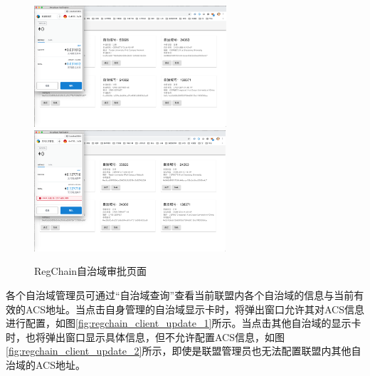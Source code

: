       \begin{figure}[H]
        \centering
        {\includegraphics[height=4.5cm]{figures/regchain_client_review_1.png}}
        \hspace{1em}
        {\includegraphics[height=4.5cm]{figures/regchain_client_review_2.png}}
        \caption{RegChain自治域审批页面}
        \label{fig:regchain_client_review}
      \end{figure}

      各个自治域管理员可通过“自治域查询”查看当前联盟内各个自治域的信息与当前有效的ACS地址。当点击自身管理的自治域显示卡时，将弹出窗口允许其对ACS信息进行配置，如图\ref{fig:regchain_client_update_1}所示。当点击其他自治域的显示卡时，也将弹出窗口显示具体信息，但不允许配置ACS信息，如图\ref{fig:regchain_client_update_2}所示，即使是联盟管理员也无法配置联盟内其他自治域的ACS地址。

